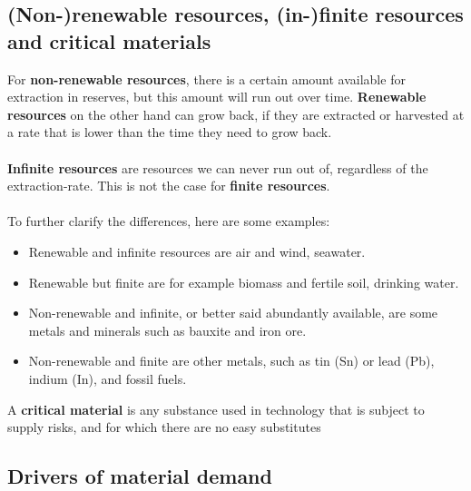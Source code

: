 \documentclass[../summary.tex]{subfiles}
\begin{document}
	\subsection{(Non-)renewable resources, (in-)finite resources and critical materials}
	
	For \textbf{non-renewable resources}, there is a certain amount available for extraction in reserves, but this amount will run out over time. \textbf{Renewable resources} on the other hand can grow back, if they are extracted or harvested at a rate that is lower than the time they need to grow back.
	\\\\
	\textbf{Infinite resources} are resources we can never run out of, regardless of the extraction-rate. This is not the case for \textbf{finite resources}.
	\\\\
	 To further clarify the differences, here are some examples:
	 \begin{itemize}
	 	\setlength{\itemsep}{0pt}
	 	\item Renewable and infinite resources are air and wind, seawater. 
	 	\item Renewable but finite are for example biomass and fertile soil, drinking water.
	 	\item Non-renewable and infinite, or better said abundantly available, are some metals and minerals such as bauxite and iron ore.
	 	\item Non-renewable and finite are other metals, such as tin (Sn) or lead (Pb), indium (In), and fossil fuels.
	 \end{itemize}
	A \textbf{critical material} is any substance used in technology that is subject to supply risks, and for which there are no easy substitutes
	
	\subsection{Drivers of material demand}
	
\end{document}
